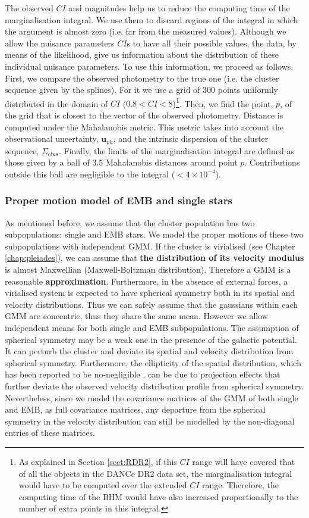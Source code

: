 The observed $CI$ and magnitudes help us  to reduce the computing time of the marginalisation integral. We use them to discard  regions of the integral in which the argument is almost zero (i.e. far from the measured values). Although we allow the nuisance parameters $CI$s to have all their possible values, the data, by means of the likelihood, give us information about the distribution of these individual nuisance parameters. To use this information, we proceed as follows. First, we compare the observed photometry to the true one (i.e. the cluster sequence given by the splines). For it we use a grid of 300 points uniformly distributed in the domain of $CI$ ($0.8<CI<8$)\footnote{\label{foot:extendedCI}As explained in Section \ref{sect:RDR2}, if this $CI$ range will have covered that of all the objects in the DANCe DR2 data set, the marginalisation integral would have to be computed over the extended $CI$ range. Therefore, the computing time of the BHM would have also increased proportionally to the number of extra points in this integral.}. Then, we find the point, $p$, of the grid that is closest to the vector of the observed photometry.  Distance is computed under  the Mahalanobis metric. This metric takes into account the observational uncertainty, $\mathbf{u}_{ph}$, and the intrinsic dispersion of the cluster sequence, $\Sigma_{clus}$. Finally, the limits of the marginalisation integral  are defined as those given by a ball of 3.5 Mahalanobis distances around point $p$. Contributions outside this ball are negligible to the integral ($< 4\times10^{-4}$).

\subsubsection{Proper motion model of EMB and single stars}
As mentioned before, we assume that the cluster population has two subpopulations: single and EMB stars.
We model the proper motions of these two subpopulations with independent GMM. If the cluster is virialised (see Chapter \ref{chap:pleiades}), we can assume that\textbf{ the distribution of its velocity modulus} is almost Maxwellian (Maxwell-Boltzman distribution). Therefore a GMM is a reasonable \textbf{approximation}. Furthermore, in the absence of external forces, a virialised system is expected to have spherical symmetry both in its spatial and velocity distributions. Thus we can safely assume that the gaussians within each GMM are concentric, thus they share the same mean. However we allow independent means for both single and EMB subpopulations. The assumption of spherical symmetry may be a weak one in the presence of the galactic potential. It can perturb the cluster and deviate its spatial and velocity distribution from spherical symmetry. Furthermore, the ellipticity of the spatial distribution, which has been reported to be no-negligible \cite[$\epsilon=0.17$, according to ][]{Raboud1998}, can be due to projection effects that further deviate the observed velocity distribution profile from spherical symmetry. Nevertheless, since we model the covariance matrices of the GMM of both single and EMB, as full covariance matrices, any departure from the spherical symmetry in the velocity distribution can still be modelled by the non-diagonal entries of these matrices.


